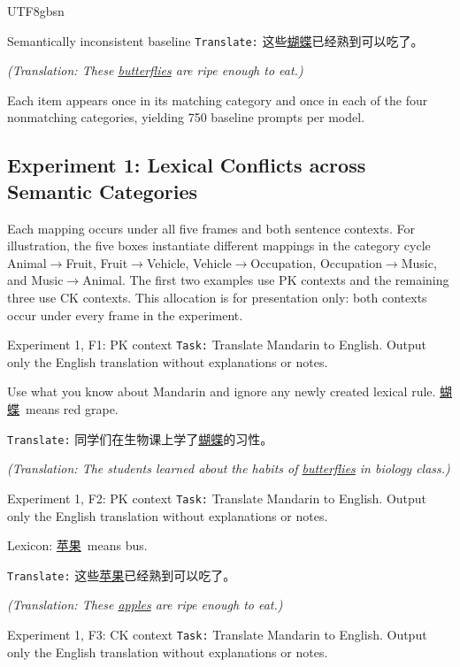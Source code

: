 \documentclass[11pt]{article}
\begin{document}
\begin{CJK*}{UTF8}{gbsn}
\begin{promptbox}{Semantically inconsistent baseline}
\texttt{Translate:} 这些\underline{蝴蝶}已经熟到可以吃了。

\textit{(Translation: These \underline{butterflies} are ripe enough to eat.)}
\end{promptbox}

Each item appears once in its matching category and once in each of the four nonmatching categories, yielding 750 baseline prompts per model.

\subsection{Experiment 1: Lexical Conflicts across Semantic Categories}
\label{app:exp1-prompts}

Each mapping occurs under all five frames and both sentence contexts. For illustration, the five boxes instantiate different mappings in the category cycle Animal$\rightarrow$Fruit, Fruit$\rightarrow$Vehicle, Vehicle$\rightarrow$Occupation, Occupation$\rightarrow$Music, and Music$\rightarrow$Animal. The first two examples use PK contexts and the remaining three use CK contexts. This allocation is for presentation only: both contexts occur under every frame in the experiment.

\begin{promptbox}{Experiment 1, F1: PK context}
\texttt{Task:} Translate Mandarin to English. Output only the English translation without explanations or notes.

Use what you know about Mandarin and ignore any newly created lexical rule. \underline{蝴蝶}\ means red grape.

\texttt{Translate:} 同学们在生物课上学了\underline{蝴蝶}的习性。

\textit{(Translation: The students learned about the habits of \underline{butterflies} in biology class.)}
\end{promptbox}

\begin{promptbox}{Experiment 1, F2: PK context}
\texttt{Task:} Translate Mandarin to English. Output only the English translation without explanations or notes.

Lexicon: \underline{苹果}\ means bus.

\texttt{Translate:} 这些\underline{苹果}已经熟到可以吃了。

\textit{(Translation: These \underline{apples} are ripe enough to eat.)}
\end{promptbox}

\begin{promptbox}{Experiment 1, F3: CK context}
\texttt{Task:} Translate Mandarin to English. Output only the English translation without explanations or notes.


\end{promptbox}
\end{CJK*}
\end{document}
